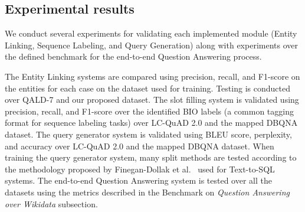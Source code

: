 \subsection*{Experimental results}
We conduct several experiments for validating each implemented module (Entity Linking, 
Sequence Labeling, and Query Generation) along with experiments over the defined 
benchmark for the end-to-end Question Answering process.

The Entity Linking systems are compared using precision, recall, and F1-score on the 
entities for each case on the dataset used for training. Testing is conducted over QALD-7 and 
our proposed dataset. The slot filling system is validated using precision, recall, and F1-score 
over the identified BIO labels (a common tagging format for sequence labeling tasks) over 
LC-QuAD 2.0 and the mapped DBQNA dataset. The query generator system is validated 
using BLEU score, perplexity, and accuracy over LC-QuAD 2.0 and the mapped DBQNA 
dataset. When training the query generator system, many split methods are tested according 
to the methodology proposed by Finegan-Dollak et al.~\cite{semPar:txt-to-sql-RadevKZZFRS18} used for Text-to-SQL systems. 
The end-to-end Question Answering system is tested over all the datasets using the metrics 
described in the Benchmark on \textit{Question Answering over Wikidata} subsection.